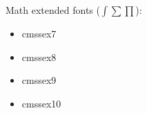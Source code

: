 \documentclass{amsart}
\begin{document}
\bigskip


Math extended fonts ($\int \sum \prod$):

\nobreak

\noindent\parbox[t]{0.25\textwidth}{
\begin{itemize}
\item \textsf{cmssex7}
\end{itemize}}\parbox[t]{0.25\textwidth}{\begin{itemize}
\item \textsf{cmssex8}
\end{itemize}}\parbox[t]{0.25\textwidth}{\begin{itemize}
\item \textsf{cmssex9}
\end{itemize}}\parbox[t]{0.25\textwidth}{\begin{itemize}
\item \textsf{cmssex10}
\end{itemize}}

\bigskip

\end{document}
